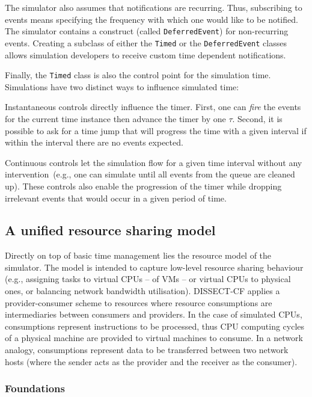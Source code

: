 \documentclass[sort, compress, 5p]{elsarticle}
\newcommand{\SMALLESTIMEGRANULARITYM}{\tau}
\newcommand{\SMALLESTIMEGRANULARITY}{$\SMALLESTIMEGRANULARITYM$}
\begin{document}
The simulator also assumes that notifications are recurring. Thus, subscribing to events means specifying the frequency with which one would like to be notified. The simulator contains a construct (called \verb+DeferredEvent+) for non-recurring events. Creating a subclass of either the \verb+Timed+ or the \verb+DeferredEvent+ classes allows simulation developers to receive custom time dependent notifications.

Finally, the \verb+Timed+ class is also the control point for the simulation time. Simulations have two distinct ways to influence simulated time:
\begin{description*}
\item[Instantaneous] controls directly influence the timer. First, one can \emph{fire} the events for the current time instance then advance the timer by one \SMALLESTIMEGRANULARITY. Second, it is possible to ask for a time jump that will progress the time with a given interval if within the interval there are no events expected.
\item[Continuous] controls let the simulation flow for a given time interval without any intervention~(e.g., one can simulate until all events from the queue are cleaned up). These controls also enable the progression of the timer while dropping irrelevant events that would occur in a given period of time.
\end{description*}

\subsection{A unified resource sharing model} \label{Sec-URSM}

Directly on top of basic time management lies the resource model of the simulator. The model is intended to capture low-level resource sharing behaviour (e.g., assigning tasks to virtual CPUs -- of VMs -- or virtual CPUs to physical ones, or balancing network bandwidth utilisation). DISSECT-CF applies a provider-consumer scheme to resources where resource consumptions are intermediaries between consumers and providers. In the case of simulated CPUs, consumptions represent instructions to be processed, thus CPU computing cycles of a physical machine are provided to virtual machines to consume.  In a network analogy, consumptions represent data to be transferred between two network hosts (where the sender acts as the provider and the receiver as the consumer).

\subsubsection{Foundations}
\end{document}
